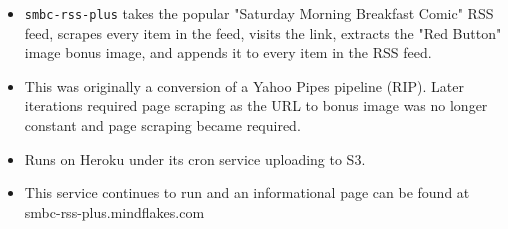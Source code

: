 \documentclass[10pt,letter,ragged2e]{altacv}
\begin{document}
\begin{paracol}{2}

\divider


\begin{itemize}
\item \texttt{smbc-rss-plus} takes the popular "Saturday Morning Breakfast Comic" RSS feed, scrapes every item in the feed, visits the link, extracts the "Red Button" image bonus image, and appends it to every item in the RSS feed.
\item This was originally a conversion of a Yahoo Pipes pipeline (RIP). Later iterations required page scraping as the URL to bonus image was no longer constant and page scraping became required.
\item Runs on Heroku under its cron service uploading to S3.
\item This service continues to run and an informational page can be found at smbc-rss-plus.mindflakes.com
\end{itemize}




\divider


\end{paracol}
\end{document}
